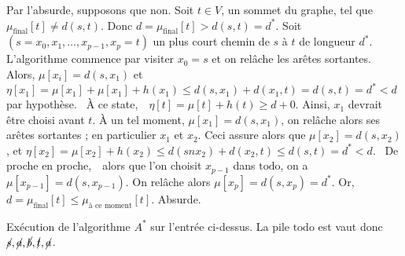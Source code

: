 {{		\begin{prv}
			Par l'absurde, supposons que non.
			Soit $t \in V$, un sommet du graphe, tel que $\mu_{\text{final}}[t] \neq d(s,t)$.
			Donc $d = \mu_{\text{final}}[t] > d(s,t) = d^*$.
			Soit $(s = x_0, x_1, \ldots, x_{p-1}, x_p = t)$ un plus court chemin de $s$ à $t$ de longueur $d^*$.
			L'algorithme commence par visiter $x_0 = s$ et on relâche les arêtes sortantes.
			Alors, $\mu[x_i] = d(s, x_1)$ et $\eta[x_1] = \mu[x_1] + \mu[x_1] + h(x_1) \le d(s, x_1) + d(x_1, t) = d(s,t) = d^* < d$ par hypothèse.
			\guillemotleft~À ce state,~\guillemotright\ $\eta[t] = \mu[t] + h(t) \ge d + 0$.
			Ainsi, $x_1$ devrait être choisi avant $t$. À un tel moment, $\mu[x_1] = d(s, x_1)$, on relâche alors ses arêtes sortantes ; en particulier $x_1$ et $x_2$. Ceci assure alors que $\mu[x_2] = d(s, x_2)$, et $\eta[x_2] = \mu[x_2] + h(x_2) \le d(sn x_2) + d(x_2, t) \le d(s,t) = d^* < d$.
			\guillemotleft~De proche en proche,~\guillemotright\ alors que l'on choisit $x_{p-1}$ dans $\mathrm{todo}$, on a $\mu[x_{p-1}] = d(s, x_{p-1})$.
			On relâche alors $\mu[x_p] = d(s, x_p) = d^*$.
			Or, $d = \mu_{\text{final}}[t] \le \mu_{\text{à ce moment}}[t]$. Absurde.
		\end{prv}
	
		\begin{exm}
			\begin{comment}
				     b (h = 6)
						/ \
				 1 /   \ 1
					/  3  \     5
				 s - - - a - - - - t
			        (h = 0)   (h = 0)
			\end{comment}
			Exécution de l'algorithme $A^*$ sur l'entrée ci-dessus.
			La pile $\mathrm{todo}$ est vaut donc $\cancel s, \cancel a, \cancel b, \cancel t, \cancel a$.
		\end{exm}
	}
	\def\addmacros#1{#1}
}
{
	\minitoc
	\renewcommand{\cwd}{../cours/annexeC/}
	\addmacros{
		
	}
	\def\addmacros#1{#1}
}
